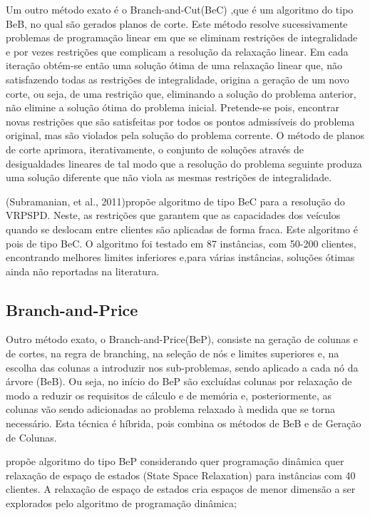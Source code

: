 Um outro método exato é o Branch-and-Cut(BeC) \cite{lieberman10},que é um algoritmo do tipo BeB, no qual são gerados planos de corte. Este método resolve sucessivamente problemas de programação linear em que se eliminam restrições de integralidade e por vezes restrições que complicam a resolução da relaxação linear. Em cada iteração obtém-se então uma solução ótima de uma relaxação linear que, não satisfazendo todas as restrições de integralidade, origina a geração de um novo corte, ou seja, de uma restrição que, eliminando a solução do problema anterior, não elimine a solução ótima do problema inicial. Pretende-se pois, encontrar novas restrições que são satisfeitas por todos os pontos admissíveis do problema original, mas são violados pela solução do problema corrente. O método de planos de corte aprimora, iterativamente, o conjunto de soluções através de desigualdades lineares de tal modo que a resolução do problema seguinte produza uma solução diferente que não viola as mesmas restrições de integralidade.

(Subramanian, et al., 2011)propõe algoritmo de tipo BeC para a resolução do VRPSPD. Neste, as restrições que garantem que as capacidades dos veículos quando se deslocam entre clientes são aplicadas de forma fraca. Este algoritmo é pois de tipo BeC. O algoritmo foi testado em 87 instâncias, com 50-200 clientes, encontrando melhores limites inferiores e,para várias instâncias, soluções ótimas ainda não reportadas na literatura. 

\subsection{Branch-and-Price}

Outro método exato, o Branch-and-Price(BeP), consiste na geração de colunas e de cortes, na regra de branching, na seleção de nós e limites superiores e, na escolha das colunas a introduzir nos sub-problemas, sendo aplicado a cada nó da árvore (BeB). Ou seja, no início do BeP são excluídas colunas por relaxação de modo a reduzir os requisitos de cálculo e de memória e, posteriormente, as colunas vão sendo adicionadas ao problema relaxado à medida que se torna necessário. Esta técnica é híbrida, pois combina os métodos de BeB e de Geração de Colunas. 

\cite{dellamico06} propõe algoritmo do tipo BeP considerando quer programação dinâmica quer relaxação de espaço de estados (State Space Relaxation) para instâncias com 40 clientes. A relaxação de espaço de estados cria espaços de menor dimensão a ser explorados pelo algoritmo de programação dinâmica;

